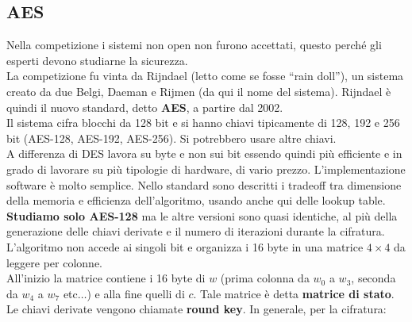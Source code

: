 \documentclass[a4paper,12pt, oneside]{book}
\begin{document}
\subsection{AES}
Nella competizione i sistemi non open non furono accettati, questo perché gli
esperti devono studiarne la sicurezza.\\
La competizione fu vinta da Rijndael (letto come se fosse ``rain doll''), un
sistema creato da 
due Belgi, Daeman e Rijmen (da qui il nome del sistema). Rijndael è quindi il
nuovo standard, detto \textbf{AES}, a partire dal 2002.\\
Il sistema cifra blocchi da 128 bit e si hanno chiavi tipicamente di 128, 192 e
256 bit (AES-128, AES-192, AES-256). Si potrebbero usare altre chiavi.\\
A differenza di DES lavora su byte e non sui bit essendo quindi più efficiente e
in grado di lavorare su più tipologie di hardware, di vario
prezzo. L'implementazione software è molto semplice. Nello standard sono
descritti i tradeoff tra dimensione della memoria e efficienza dell'algoritmo,
usando anche qui delle lookup table.\\
\textbf{Studiamo solo AES-128} ma le altre versioni sono quasi identiche, al più
della generazione delle chiavi derivate e il numero di iterazioni durante la
cifratura.\\ 
L'algoritmo non accede ai singoli bit e organizza i 16 byte in una matrice
$4\times 4$ da leggere per colonne.\\
All'inizio la matrice contiene i 16 byte di $w$ (prima colonna da $w_0$ a $w_3$,
seconda da $w_4$ a $w_7$ etc$\ldots$) e alla fine quelli di $c$. Tale matrice è
detta \textbf{matrice di stato}.\\
Le chiavi derivate vengono chiamate \textbf{round key}.
In generale, per la cifratura:
\end{document}
